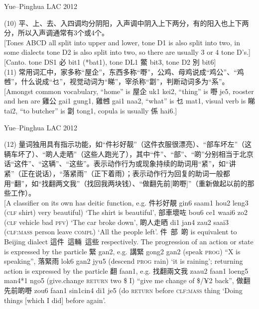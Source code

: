 \documentclass{beamer}
\begin{document}
\begin{frame}[fragile]{Yue–Pinghua \scriptsize{LAC 2012}}

{\small
(10) 平、上、去、入四调均分阴阳，入声调中阴入上下两分，有的阳入也上下两分，所以入声调通常有3个或4个。\\
{\scriptsize[Tones ABCD all split into upper and lower, tone D1 is also split into two, in some dialects tone D2 is also split into two, so there are usually 3 or 4 tone D's.]}\\
{[Canto. tone DS1 必 bit1 (*bat1), tone DL1 鱉 bit3, tone D2 別 bit6]}\\
\medskip
(11) 常用词汇中，家多称“屋企”，东西多称“嘢”，公鸡、母鸡说成“鸡公”、“鸡乸”，什么说成“乜”，视觉动词为“睇”，宰杀称“劏”，判断动词多为“系”。\\
{\scriptsize[Amongst common vocabulary, \enquote{home} is 屋企 uk1 kei2, \enquote{thing} is 嘢 je5, rooster and hen are 雞公 gai1 gung1, 雞乸 gai1 naa2, \enquote{what} is 乜 mat1, visual verb is 睇 tai2, \enquote{to butcher} is 劏 tong1, copula is usually 係 hai6.]}\\
}
\end{frame}

\begin{frame}[fragile]{Yue–Pinghua \scriptsize{LAC 2012}}

{\small
(12) 量词独用具有指示功能，如“件衫好靓”（这件衣服很漂亮）、“部车坏左”（这辆车坏了）、“啲人走晒”（这些人跑光了），其中“件”、“部”、“啲”分别相当于北京话“这件”、“这辆”、“这些”。表示动作行为或现象持续的助词用“紧”，如“讲紧”（正在说话），“落紧雨”（正下着雨）；表示动作行为回复的助词一般都用“翻”，如“找翻两文我”（找回我两块钱）、“做翻先前[啲嘢]”（重新做起以前的那些工作）。\\
{\scriptsize[A classifier on its own has deitic function, e.g. 件衫好靚 gin6 saam1 hou2 leng3 (\textsc{clf} shirt) very beautiful) \enquote*{The shirt is beautiful}, 部車壞咗 bou6 ce1 waai6 zo2 (\textsc{clf} vehicle bad \textsc{pfv}) \enquote*{The car broke down}, 啲人走晒 di1 jan4 zau2 saai3 (\textsc{clf:mass} person leave \textsc{compl}) \enquote*{All the people left}. 件\ 部\ 啲 is equivalent to Beijing dialect 這件\ 這輛\ 這些 respectively. The progression of an action or state is expressed by the particle 緊 gan2, e.g. 講緊 gong2 gan2 (speak \textsc{prog}) \enquote{X is speaking}, 落緊雨 lok6 gan2 jyu5 (descend \textsc{prog} rain) \enquote*{it is raining}; returning action is expressed by the particle 翻 faan1, e.g. 找翻兩文我 zaau2 faan1 loeng5 man4*1 ngo5 (give.change \textsc{return} two \$ I) \enquote{give me change of \$/¥2 back}, 做翻先前啲嘢 zou6 faan1 sin1cin4 di1 je5 (do \textsc{return} before \textsc{clf:mass} thing \enquote*{Doing things [which I did] before again}.}\\
}
\end{frame}
\end{document}
